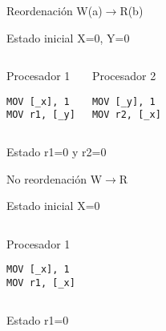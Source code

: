 \begin{frame}[t,fragile]{Reordenación W(a)$\rightarrow$R(b)}

\begin{block}{Estado inicial}
X=0, Y=0
\end{block}


\begin{columns}[T]


\begin{block}{Procesador 1}
\begin{lstlisting}[language={[x86masm]Assembler}]
MOV [_x], 1
MOV r1, [_y]
\end{lstlisting}
\end{block}

\begin{block}{Procesador 2}
\begin{lstlisting}[language={[x86masm]Assembler}]
MOV [_y], 1
MOV r2, [_x]
\end{lstlisting}
\end{block}

\end{columns}


\begin{block}{Estado }
r1=0 y r2=0
\end{block}

\end{frame}



\begin{frame}[t,fragile]{No reordenación W$\rightarrow$R}

\begin{block}{Estado inicial}
X=0
\end{block}


\begin{columns}[T]


\begin{block}{Procesador 1}
\begin{lstlisting}[language={[x86masm]Assembler}]
MOV [_x], 1
MOV r1, [_x]
\end{lstlisting}
\end{block}


\end{columns}


\begin{block}{Estado }
r1=0
\end{block}

\end{frame}



